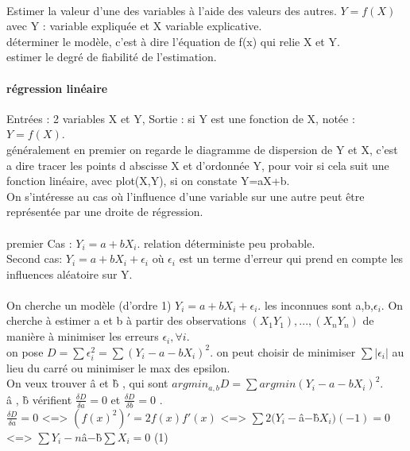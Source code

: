\documentclass{article}
\begin{document}
\paragraph{} Estimer la valeur d'une des variables à l'aide des valeurs des autres. $Y=f(X)$ avec Y  : variable expliquée et X variable explicative.\\déterminer le modèle, c'est à dire l'équation de f(x) qui relie X et Y.\\estimer le degré de fiabilité de l'estimation.
\newpage
\paragraph{régression linéaire} Entrées : 2 variables X et Y, Sortie : si Y est une fonction de X, notée : $Y=f(X)$.\\généralement en premier on regarde le diagramme de dispersion de Y et X, c'est a dire tracer les points d abscisse X et d'ordonnée Y, pour voir si cela suit une fonction linéaire, avec plot(X,Y), si on constate Y=aX+b.\\On s'intéresse au cas où l'influence d'une variable sur une autre peut être représentée par une droite de régression.\\\\ premier Cas : $Y_i =a+bX_i$. relation déterministe peu probable.\\Second cas:  $Y_i = a+bX_i+\epsilon_i$ où $\epsilon_i$ est un terme d'erreur qui prend en compte les influences aléatoire sur Y.\\\\
On cherche un modèle (d'ordre 1) $Y_i = a+bX_i+ \epsilon_i$. les inconnues sont a,b,$\epsilon_i$.  On cherche à estimer a et b à partir des observations $(X_1Y_1),...,(X_nY_n)$ de manière à minimiser les erreurs $\epsilon_i , \forall i$.\\on pose $D=\sum \epsilon_i^2 = \sum (Y_i-a-bX_i)^2$. on peut choisir de minimiser $\sum |\epsilon_i|$ au lieu du carré ou minimiser le max des epsilon.\\On veux trouver \^a et \^b , qui sont $ argmin_{a,b} D= \sum argmin(Y_i-a-bX_i)^2$.\\
\^a , \^b vérifient $\frac{\delta D}{\delta a} = 0$ et $\frac{\delta D}{\delta b} = 0$ .\\
$\frac{\delta D}{\delta a} = 0$ <=> $(f(x)^2)' = 2f(x)f'(x)$ <=> $\sum 2(Y_i-$\^a$-$\^b$X_i)(-1) = 0$ <=> $\sum Y_i - n$\^a$-$\^b$\sum X_i=0$ (1)\\\\
\end{document}
